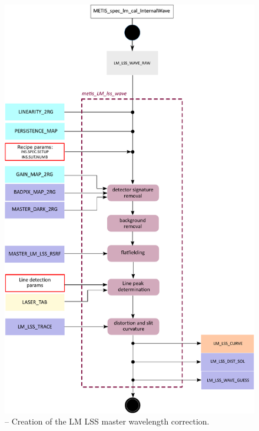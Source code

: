 \begin{figure}[ht]
  \centering
  \includegraphics[width=0.5\textheight]{figures/metis_lm_lss_wave_v0.83.pdf}
  \caption[Recipe: ]{ --
    Creation of the LM LSS master wavelength correction.}
  \label{Fig:rec_lm_lss_trace}
\end{figure}
\clearpage

